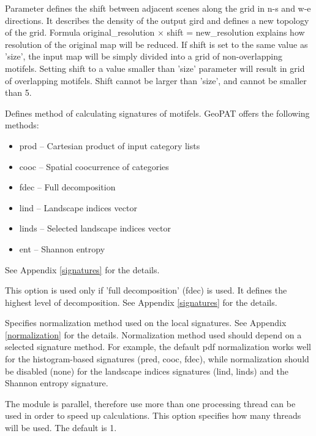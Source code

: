 Parameter defines the shift between adjacent scenes along the grid in n-s and w-e directions. 
It describes the density of the output gird and defines a new topology of the grid.
Formula original\_resolution $\times$ shift = new\_resolution explains how resolution of the original map will be reduced. 
If shift is set to the same value as 'size', the input map will be simply divided into a grid of non-overlapping motifels. 
Setting shift to a value smaller than 'size' parameter will result in grid of overlapping motifels. 
Shift cannot be larger than 'size', and cannot be smaller than 5.


Defines method of calculating signatures of motifels. GeoPAT offers the following methods: 
\begin{itemize}
	\item prod -- Cartesian product of input category lists
	\item cooc -- Spatial coocurrence of categories
	\item fdec -- Full decomposition
	\item lind -- Landscape indices vector
	\item linds -- Selected landscape indices vector
	\item ent -- Shannon entropy
\end{itemize}
See Appendix \ref{signatures} for the details.


This option is used only if 'full decomposition' (fdec) is used.
It defines the highest level of decomposition. See Appendix \ref{signatures} for the details.


Specifies normalization method used on the local signatures. 
See Appendix \ref{normalization} for the details.
Normalization method used should depend on a selected signature method. 
For example, the default pdf normalization works well for the histogram-based signatures (pred, cooc, fdec), while normalization should be disabled (none) for the landscape indices signatures (lind, linds) and the Shannon entropy signature.


The module is parallel, therefore use more than one processing thread can be used in order to speed up calculations. 
This option specifies how many threads will be used. 
The default is 1.
\\\\

